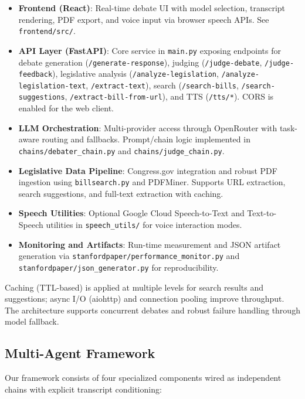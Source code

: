 \documentclass{article}
\begin{document}
\begin{itemize}
    \item \textbf{Frontend (React)}: Real-time debate UI with model selection, transcript rendering, PDF export, and voice input via browser speech APIs. See \texttt{frontend/src/}.
    \item \textbf{API Layer (FastAPI)}: Core service in \texttt{main.py} exposing endpoints for debate generation (\texttt{/generate-response}), judging (\texttt{/judge-debate}, \texttt{/judge-feedback}), legislative analysis (\texttt{/analyze-legislation}, \texttt{/analyze-legislation-text}, \texttt{/extract-text}), search (\texttt{/search-bills}, \texttt{/search-suggestions}, \texttt{/extract-bill-from-url}), and TTS (\texttt{/tts/*}). CORS is enabled for the web client.
    \item \textbf{LLM Orchestration}: Multi-provider access through OpenRouter with task-aware routing and fallbacks. Prompt/chain logic implemented in \texttt{chains/debater\_chain.py} and \texttt{chains/judge\_chain.py}.
    \item \textbf{Legislative Data Pipeline}: Congress.gov integration and robust PDF ingestion using \texttt{billsearch.py} and PDFMiner. Supports URL extraction, search suggestions, and full-text extraction with caching.
    \item \textbf{Speech Utilities}: Optional Google Cloud Speech-to-Text and Text-to-Speech utilities in \texttt{speech\_utils/} for voice interaction modes.
    \item \textbf{Monitoring and Artifacts}: Run-time measurement and JSON artifact generation via \texttt{stanfordpaper/performance\_monitor.py} and \texttt{stanfordpaper/json\_generator.py} for reproducibility.
\end{itemize}

Caching (TTL-based) is applied at multiple levels for search results and suggestions; async I/O (aiohttp) and connection pooling improve throughput. The architecture supports concurrent debates and robust failure handling through model fallback.

\subsection{Multi-Agent Framework}

Our framework consists of four specialized components wired as independent chains with explicit transcript conditioning:
\end{document}

